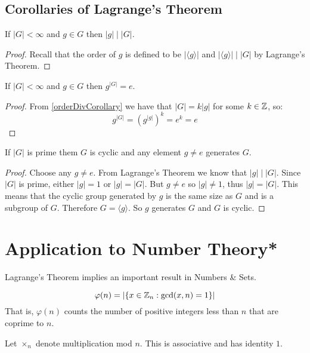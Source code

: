 \documentclass[../main.tex]{subfiles}
\begin{document}
\subsection{Corollaries of Lagrange's Theorem}
\begin{corollary}
  \label{orderDivCorollary}
  If $|G| < \infty$ and $g \in G$ then $|g| \mid |G|$.
\end{corollary}
\begin{proof}
  Recall that the order of $g$ is defined to be $|\langle g \rangle|$ and $|\langle g \rangle| \mid |G|$ by Lagrange's Theorem.
\end{proof}
\begin{corollary}
  If $|G| < \infty$ and $g \in G$ then $g^{|G|} = e$.
\end{corollary}
\begin{proof}
  From \cref{orderDivCorollary} we have that $|G| = k |g|$ for some $k \in \mathbb{Z}$, so:
  \[
    g^{|G|} = (g^{|g|})^{k} = e^{k} = e
  \]
\end{proof}
\begin{corollary}
  If $|G|$ is prime them $G$ is cyclic and any element $g \neq e$ generates $G$.
\end{corollary}
\begin{proof}
  Choose any $g \neq e$.
  From Lagrange's Theorem we know that $|g| \mid |G|$.
  Since $|G|$ is prime, either $|g| = 1$ or $|g| = |G|$.
  But $g \neq e$ so $|g| \neq 1$, thus $|g| = |G|$.
  This means that the cyclic group generated by $g$ is the same size as $G$ and is a subgroup of $G$.
  Therefore $G = \langle g \rangle$.
  So $g$ generates $G$ and $G$ is cyclic.
\end{proof}
\section{Application to Number Theory*}
\nonexaminable
Lagrange's Theorem implies an important result in Numbers \& Sets.
\begin{definition}
  \[
    \varphi(n) = |\{x \in \mathbb{Z}_n : \gcd(x, n) = 1\}|
  \]
  That is, $\varphi(n)$ counts the number of positive integers less than $n$ that are coprime to $n$.
\end{definition}
\begin{remark}[Notation]
  Let $\times_n$ denote multiplication mod $n$.
  This is associative and has identity $1$.
\end{remark}
\end{document}
